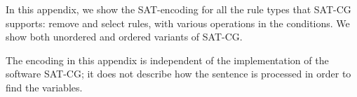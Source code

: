 \def\sobre{\text{\em sobre}}
\def\una{\text{\em una}}
\def\aproximacion{\text{ \em aproximaci\'{o}n}}
\def\mas{\text{\em m\'{a}s}}
\def\cientifica{\text{\em cient\'{\i}fica}}


\def\vPrsPThree{\text{\em PrsP3}}
\def\vPrsPOne{\text{\em PrsP1}}
\def\vImpPThree{\text{\em ImpP3}}
\def\adj{{\text{\em Adj}}}
\def\adv{{\text{\em Adv}}}
\def\n{\text{\em N}}
\def\pr{{\text{\em Pr}}}
\def\prn{{\text{\em Prn}}}
\def\det{{\text{\em Det}}}
\def\notDet{{\neg \text{\em Det}}}
\def\any{{\text{Any}}}


\def\sobrePr{\sobre_\pr}
\def\sobreN{\sobre_\n}

\def\unaNotDet{\una_\notDet}
\def\unaAny{\una_\any}
\def\unaPrn{\una_\prn}
\def\unaDet{\una_\det}
\def\unaPrsPThree{\una_\vPrsPThree}
\def\unaPrsPOne{\una_\vPrsPOne}
\def\unaImp{\una_\vImpPThree}
\def\aproximacionN{\aproximacion_\n}
\def\masAdv{\mas_\adv}
\def\masAdj{\mas_\adj}
\def\cientificaAdj{\cientifica_\adj}
\def\cientificaN{\cientifica_\n}

\def\cgrule#1{\noindent {\bf  #1 }}
\def\eqdef{\Coloneqq}
\def\impl{\quad\Longrightarrow\quad}

\def\ob#1{\overbrace{ #1 \rule{0pt}{2ex}}}







\noindent In this appendix, we show the SAT-encoding for all the rule types that 
SAT-CG supports: {\sc remove} and {\sc select} rules, with various operations in the conditions. We show both unordered and ordered variants of SAT-CG.

The encoding in this appendix is independent of the implementation of the software SAT-CG; it does not describe how the sentence is processed in order to find the variables.

